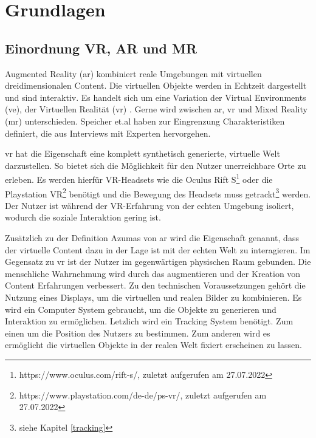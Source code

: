 \section{Grundlagen}
\subsection {Einordnung VR, AR und MR}
Augmented Reality (\acrshort{ar}) kombiniert reale Umgebungen mit virtuellen dreidimensionalen Content. Die virtuellen Objekte werden in Echtzeit dargestellt und sind interaktiv. Es handelt sich um eine Variation der Virtual Environments (\acrshort{ve}), der Virtuellen Realität (\acrshort{vr}) \cite[Azuma,][]{Azuma1997}. Gerne wird zwischen \acrshort{ar}, \acrshort{vr} und Mixed Reality (\acrshort{mr}) unterschieden. Speicher et.al \cite*{Speicher2019} haben zur Eingrenzung Charakteristiken definiert, die aus Interviews mit Experten hervorgehen. 

\acrshort{vr} hat die Eigenschaft eine komplett synthetisch generierte, virtuelle Welt darzustellen. So bietet sich die Möglichkeit für den Nutzer unerreichbare Orte zu erleben. Es werden hierfür VR-Headsets wie die Oculus Rift S\footnote{https://www.oculus.com/rift-s/, zuletzt aufgerufen am 27.07.2022} oder die Playstation VR\footnote{https://www.playstation.com/de-de/ps-vr/, zuletzt aufgerufen am 27.07.2022} benötigt und die Bewegung des Headsets muss getrackt\footnote{siehe Kapitel \ref{tracking} } werden. Der Nutzer ist während der VR-Erfahrung von der echten Umgebung isoliert, wodurch die soziale Interaktion gering ist. 

Zusätzlich zu der Definition Azumas\cite{Azuma1997} von \acrshort{ar} wird die Eigenschaft genannt, dass der virtuelle Content dazu in der Lage ist mit der echten Welt zu interagieren. Im Gegensatz zu \acrshort{vr} ist der Nutzer im gegenwärtigen physischen Raum gebunden. Die menschliche Wahrnehmung wird durch das augmentieren und der Kreation von Content Erfahrungen verbessert\cite[Speicher,][]{Speicher2019}. Zu den technischen Voraussetzungen gehört die Nutzung eines Displays, um die virtuellen und realen Bilder zu kombinieren. Es wird ein Computer System gebraucht, um die Objekte zu generieren und Interaktion zu ermöglichen. Letzlich wird ein Tracking System benötigt. Zum einen um die Position des Nutzers zu bestimmen. Zum anderen wird es ermöglicht die virtuellen Objekte in der realen Welt fixiert erscheinen zu lassen\cite[Billinghurst,][]{billinghurst2015}. 


